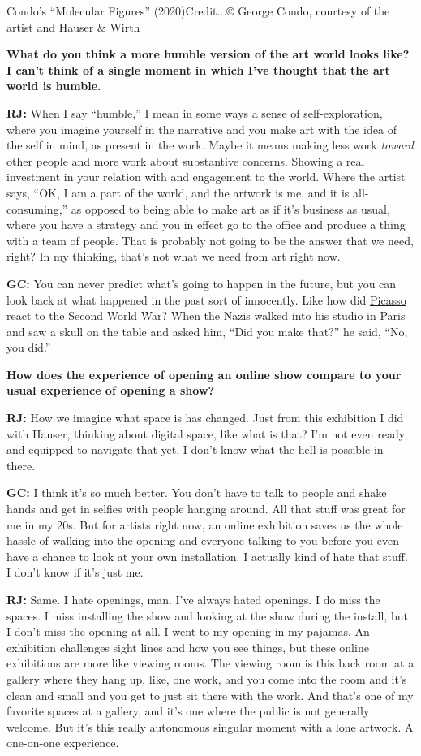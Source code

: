 Condo's ``Molecular Figures'' (2020)Credit...© George Condo, courtesy of
the artist and Hauser \& Wirth

\textbf{What do you think a more humble version of the art world looks
like? I can't think of a single moment in which I've thought that the
art world is humble.}

\textbf{RJ:} When I say ``humble,'' I mean in some ways a sense of
self-exploration, where you imagine yourself in the narrative and you
make art with the idea of the self in mind, as present in the work.
Maybe it means making less work \emph{toward} other people and more work
about substantive concerns. Showing a real investment in your relation
with and engagement to the world. Where the artist says, ``OK, I am a
part of the world, and the artwork is me, and it is all-consuming,'' as
opposed to being able to make art as if it's business as usual, where
you have a strategy and you in effect go to the office and produce a
thing with a team of people. That is probably not going to be the answer
that we need, right? In my thinking, that's not what we need from art
right now.

\textbf{GC:} You can never predict what's going to happen in the future,
but you can look back at what happened in the past sort of innocently.
Like how did
\href{https://www.nytimes3xbfgragh.onion/topic/person/pablo-picasso}{Picasso}
react to the Second World War? When the Nazis walked into his studio in
Paris and saw a skull on the table and asked him, ``Did you make that?''
he said, ``No, you did.''

\textbf{How does the experience of opening an online show compare to
your usual experience of opening a show?}

\textbf{RJ:} How we imagine what space is has changed. Just from this
exhibition I did with Hauser, thinking about digital space, like what is
that? I'm not even ready and equipped to navigate that yet. I don't know
what the hell is possible in there.

\textbf{GC:} I think it's so much better. You don't have to talk to
people and shake hands and get in selfies with people hanging around.
All that stuff was great for me in my 20s. But for artists right now, an
online exhibition saves us the whole hassle of walking into the opening
and everyone talking to you before you even have a chance to look at
your own installation. I actually kind of hate that stuff. I don't know
if it's just me.

\textbf{RJ:} Same. I hate openings, man. I've always hated openings. I
do miss the spaces. I miss installing the show and looking at the show
during the install, but I don't miss the opening at all. I went to my
opening in my pajamas. An exhibition challenges sight lines and how you
see things, but these online exhibitions are more like viewing rooms.
The viewing room is this back room at a gallery where they hang up,
like, one work, and you come into the room and it's clean and small and
you get to just sit there with the work. And that's one of my favorite
spaces at a gallery, and it's one where the public is not generally
welcome. But it's this really autonomous singular moment with a lone
artwork. A one-on-one experience.

